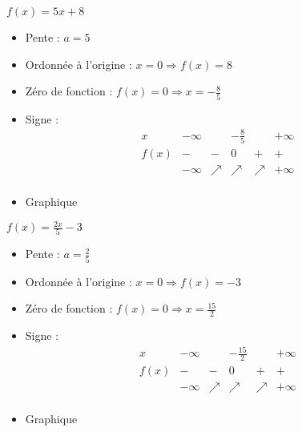 \begin{solution}
$f(x)=5x+8$
\begin{itemize}
\item Pente :	$a=5$
\item Ordonnée à l’origine :	$x=0\Rightarrow f(x)=8$ 
\item Zéro de fonction :	$f(x)=0\Rightarrow x=-\frac{8}{5}$
\item Signe :
$$\begin{array}{l|l|l|l|l|l}
x    & -\infty &   & -\frac{8}{5} &   & +\infty \\
\hline
f(x) & -       & - & 0  & + & +   \\
 & -\infty & \nearrow & \nearrow & \nearrow & +\infty \\   
\end{array}$$
\item Graphique
\end{itemize}
\end{solution}

\begin{solution}
$f(x)=\frac{2x}{5}-3$
\begin{itemize}
\item Pente :	$a=\frac{2}{5}$
\item Ordonnée à l’origine :	$x=0\Rightarrow f(x)=-3$ 
\item Zéro de fonction :	$f(x)=0\Rightarrow x=\frac{15}{2}$
\item Signe :
$$\begin{array}{l|l|l|l|l|l}
x    & -\infty &   & -\frac{15}{2} &   & +\infty \\
\hline
f(x) & -       & - & 0  & + & +   \\
 & -\infty & \nearrow & \nearrow & \nearrow & +\infty \\   
\end{array}$$
\item Graphique
\end{itemize}
\end{solution}

